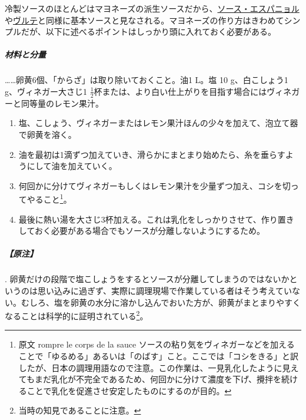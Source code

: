 \begin{recette}


冷製ソースのほとんどはマヨネーズの派生ソースだから、\protect\hyperlink{sauce-espagnole}{ソース・エスパニョル}や\protect\hyperlink{veloute}{ヴルテ}と同様に基本ソースと見なされる。マヨネーズの作り方はきわめてシンプルだが、以下に述べるポイントはしっかり頭に入れておく必要がある。

\hypertarget{proportions-mayonnaise}{%
\subparagraph{材料と分量}\label{proportions-mayonnaise}}

\ldots{}\ldots{}卵黄6個、「からざ」は取り除いておくこと。油1 L。塩 10
g、白こしょう1 g、ヴィネガー大さじ1
\(\frac{1}{2}\)杯または、より白い仕上がりを目指す場合にはヴィネガーと同等量のレモン果汁。

\begin{enumerate}
\def\labelenumi{\arabic{enumi}.}
\item
  塩、こしょう、ヴィネガーまたはレモン果汁ほんの少々を加えて、泡立て器で卵黄を溶く。
\item
  油を最初は1滴ずつ加えていき、滑らかにまとまり始めたら、糸を垂らすようにして油を加えていく。
\item
  何回かに分けてヴィネガーもしくはレモン果汁を少量ずつ加え、コシを切ってやること\footnote{原文
    rompre le corps de la sauce
    ソースの粘り気をヴィネガーなどを加えることで「ゆるめる」あるいは「のばす」こと。ここでは「コシをきる」と訳したが、日本の調理用語なので注意。この作業は、一見乳化したように見えてもまだ乳化が不完全であるため、何回かに分けて濃度を下げ、攪拌を続けることで乳化を促進させ安定したものにするのが目的。}。
\item
  最後に熱い湯を大さじ3杯加える。これは乳化をしっかりさせて、作り置きしておく必要がある場合でもソースが分離しないようにするため。
\end{enumerate}

\hypertarget{nota-mayonnaise}{%
\subparagraph{【原注】}\label{nota-mayonnaise}}

.
卵黄だけの段階で塩こしょうをするとソースが分離してしまうのではないかというのは思い込みに過ぎず、実際に調理現場で作業している者はそう考えていない。むしろ、塩を卵黄の水分に溶かし込んでおいた方が、卵黄がまとまりやすくなることは科学的に証明されている\footnote{当時の知見であることに注意。}。


\end{recette}
